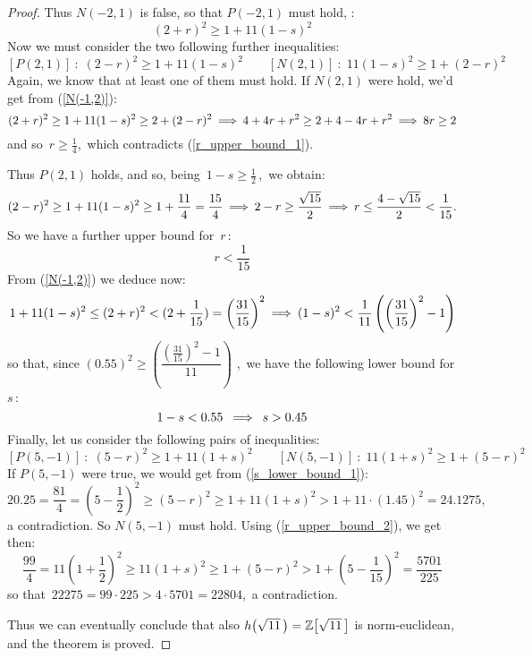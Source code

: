 \begin{proof}
Thus $N(-2, 1)$ is false, so that $P(-2, 1)$ must hold, \ie:
\begin{equation}\label{N(-1,2)}
(2 + r)^2 \geq 1 + 11(1 - s)^2
\end{equation}
%
Now we must consider the two following further inequalities:
$$
\left[P(2,1)\right]\::\; (2 - r)^2 \geq 1 + 11(1 - s)^2
\quad\quad
\left[N(2,1)\right]\::\; 11(1 - s)^2 \geq 1 + (2 - r)^2
$$
Again, we know that at least one of them must hold.
If $N(2,1)$ were hold, we'd get from (\ref{N(-1,2)}):
$$
(2 + r)^2 \geq 1 + 11(1 - s)^2 \geq 2 + (2 - r)^2
\:\Longrightarrow\: 4 + 4r + r^2 \geq 2 + 4 - 4r + r^2 \:\Longrightarrow\: 8r \geq 2
$$
and so\, $r \geq \frac{1}{4}$,\, which contradicts
(\ref{r_upper_bound_1}).

Thus $P(2,1)$ holds, and so, being\, $1 - s \geq \frac{1}{2}$\,,\,
we obtain:
$$
(2 - r)^2 \geq 1 +11(1 - s)^2 \geq 1 + \frac{11}{4}
= \frac{15}{4} \:\Longrightarrow\: 2 - r \geq \frac{\sqrt{15}}{2} \:\Longrightarrow\:
r \leq \frac{4 - \sqrt{15}}{2} < \frac{1}{15}.
$$
\medskip
So we have a further upper bound for\, $r$\,:
\begin{equation}\label{r_upper_bound_2}
r < \frac{1}{15}
\end{equation}
%
From (\ref{N(-1,2)}) we deduce now:
$$
1 + 11(1 - s)^2 \leq (2 + r)^2 < (2 + \frac{1}{15})
= \left(\frac{31}{15}\right)^2 \:\Longrightarrow\: (1 - s)^2 <
\frac{1}{11}\left(\left(\frac{31}{15}\right)^2-1\right)
$$
so that, since\: $(0.55)^2 \geq
\left(\dfrac{\left(\frac{31}{15}\right)^2 - 1}{11}\right)$%
,\, we have the following lower bound for $s$\,:
\begin{equation}\label{s_lower_bound_1}
1 - s < 0.55 \;\:\Longrightarrow\:\; s > 0.45
\end{equation}
Finally, let us consider the following pairs of inequalities:
$$
\left[P(5,-1)\right]\::\; (5 - r)^2 \geq 1 + 11(1 + s)^2
\quad\quad
\left[N(5,-1)\right]\::\; 11(1 + s)^2 \geq 1 + (5 - r)^2
$$
If $P(5, -1)$ were true, we would get from
(\ref{s_lower_bound_1}):\\
$$
20.25 = \frac{81}{4} = \left(5 - \frac{1}{2}\right)^2 \geq
(5 - r)^2 \geq 1 + 11(1 + s)^2 > 1 + 11\cdot(1.45)^2 =
24.1275,
$$
a contradiction.
So $N(5, -1)$ must hold.
Using (\ref{r_upper_bound_2}), we get then:
$$
\frac{99}{4} = 11\left(1 + \frac{1}{2}\right)^2 \geq
11(1 + s)^2 \geq1 + (5 - r)^2 >
1 + \left(5 - \frac{1}{15}\right)^2 = \frac{5701}{225}
$$
so that\, $22275 = 99 \cdot 225 > 4 \cdot 5701 = 22804$,\,
a contradiction.

\medskip
Thus we can eventually conclude that also $\hh{11} = \ZZ{11}$
is norm-euclidean, and the theorem is proved.
%
\end{proof}

